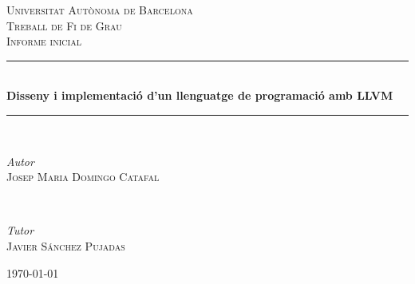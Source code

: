 ﻿\documentclass{article}
\begin{document}
\begin{titlepage}
	\newcommand{\HRule}{\rule{\linewidth}{0.4mm}} %
	
	\center

    \vspace*{25px}
	
	\textsc{\LARGE Universitat Autònoma de Barcelona}\\[1.5cm]
	
	\textsc{\Large Treball de Fi de Grau}\\[0.5cm]
	
	\textsc{\Large Informe inicial}\\[0.5cm]
	
	\HRule\\[0.4cm]
	
	{\LARGE\bfseries Disseny i implementació d'un llenguatge de programació amb LLVM}\\[0.4cm]
	
	\HRule\\[1.5cm]
	
	
	\begin{minipage}{0.5\textwidth}
		\begin{flushleft}
			\large
			\textit{Autor}\\
			\textsc{Josep Maria Domingo Catafal}
		\end{flushleft}
	\end{minipage}
	~
	\begin{minipage}{0.4\textwidth}
		\begin{flushright}
			\large
			\textit{Tutor}\\
			\textsc{Javier Sánchez Pujadas}
		\end{flushright}
	\end{minipage}
	

	\vfill\vfill\vfill %
	
	{\large\today} %

	\vfill %
\end{titlepage}

\tableofcontents
\newpage

\end{document}
